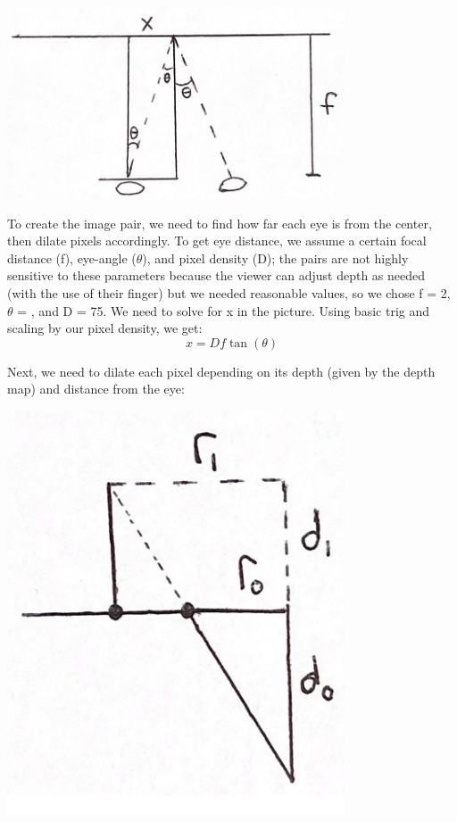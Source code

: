\documentclass[12pt]{article}
\begin{document}
\begin{center}
\includegraphics[width=100mm]{eye_disp_pic.png}
\end{center}

To create the image pair, we need to find how far each eye is from the center, then dilate pixels accordingly. To get eye distance, we assume a certain focal distance (f), eye-angle (\(\theta\)), and pixel density (D); the pairs are not highly sensitive to these parameters because the viewer can adjust depth as needed (with the use of their finger) but we needed reasonable values, so we chose f = 2, \(\theta\) = , and D = 75. We need to solve for x in the picture. Using basic trig and scaling by our pixel density, we get: \[x = Df\tan(\theta)\]

Next, we need to dilate each pixel depending on its depth (given by the depth map) and distance from the eye:

\begin{center}
\includegraphics[width=100mm]{dilation_pic.png}
\end{center}
\end{document}
